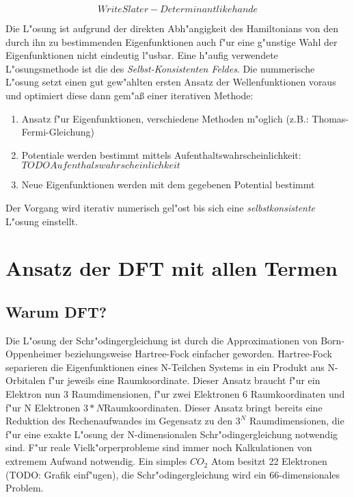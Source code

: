 $$Write Slater-Determinant like hande$$

Die L"osung ist aufgrund der direkten Abh"angigkeit des Hamiltonians von den durch ihn zu bestimmenden Eigenfunktionen auch f"ur eine g"unstige Wahl der Eigenfunktionen nicht eindeutig l"usbar. Eine h"aufig verwendete L"osungsmethode ist die des \textit{Selbst-Konsistenten Feldes}. Die nummerische L"osung setzt einen gut gew"ahlten ersten Ansatz der Wellenfunktionen voraus und optimiert diese dann gem"aß einer iterativen Methode: 


\begin{enumerate}
	\item Ansatz f"ur Eigenfunktionen, verschiedene Methoden m"oglich (z.B.: Thomas-Fermi-Gleichung)
	\item Potentiale werden bestimmt mittels Aufenthaltswahrscheinlichkeit: $TODO Aufenthalswahrscheinlichkeit$
	\item Neue Eigenfunktionen werden mit dem gegebenen Potential bestimmt 
\end{enumerate}

Der Vorgang wird iterativ numerisch gel"ost bis sich eine \textit{selbstkonsistente} L"osung einstellt. 





\section{Ansatz der DFT mit allen Termen}
\subsection{Warum DFT?}
Die L"osung der Schr"odingergleichung ist durch die Approximationen von Born-Oppenheimer beziehungsweise Hartree-Fock einfacher geworden.
Hartree-Fock separieren die Eigenfunktionen eines N-Teilchen Systems in ein Produkt aus N-Orbitalen f"ur jeweils eine Raumkoordinate. Dieser Ansatz braucht f"ur ein Elektron nun 3 Raumdimensionen, f"ur zwei Elektronen 6 Raumkoordinaten und f"ur N Elektronen $3*N$Raumkoordinaten. Dieser Ansatz bringt bereits eine Reduktion des Rechenaufwandes im Gegensatz zu den $3^N$ Raumdimensionen, die f"ur eine exakte L"osung der N-dimensionalen Schr"odingergleichung notwendig sind. F"ur reale Vielk"orperprobleme sind immer noch Kalkulationen von extremem Aufwand notwendig. Ein simples $CO_2$ Atom besitzt 22 Elektronen (TODO: Grafik einf"ugen), die Schr"odingergleichung wird ein 66-dimensionales Problem. 

